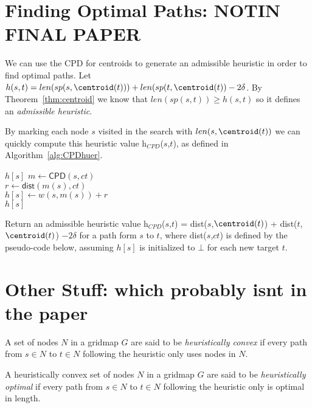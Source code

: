 \section{Finding Optimal Paths: NOTIN FINAL PAPER}

We can use the CPD for centroids 
to generate an admissible heuristic in order to find optimal paths.
Let $h(s,t) = len(sp(s,\centroid(t))) + 
                                len(sp(t,\centroid(t)) - 2 \delta$.
By Theorem~\ref{thm:centroid} we know that $len(sp(s,t)) \geq h(s,t)$ so
it defines an \emph{admissible heuristic}.

By marking each node $s$ visited in the search with $len(s,\centroid(t))$
we can quickly compute this heuristic value \textsf{h$_{CPD}$}($s$,$t$),
as defined in Algorithm~\ref{alg:CPDhuer}.

\begin{algorithm}
   {
     {\Return $h[s]$}
    $m \gets \textsf{CPD}(s,ct)$ \\
    $r \gets \textsf{dist}(m(s),ct)$ \\
    $h[s] \gets w(s,m(s)) + r$ \\
    \Return $h[s]$
   }    
\caption{Return an admissible heuristic value 
\textsf{h$_{CPD}$}($s$,$t$) = \textsf{dist}($s$,$\centroid(t)$) + \textsf{dist}($t$,$\centroid(t)$) $- 2\delta$
for a path form $s$ to $t$, where \textsf{dist}($s$,$ct$) is defined by the pseudo-code below, assuming $h[s]$ is initialized to $\bot$ for each new target $t$.}
\label{alg:CPDhuer}
\end{algorithm}




\section{Other Stuff: which probably isnt in the paper}

A set of nodes $N$ in a gridmap $G$ are said to be \emph{heuristically convex}
if every path from $s \in N$ to $t \in N$ following the heuristic only 
uses nodes in $N$. 

A heuristically convex 
set of nodes $N$ in a gridmap $G$ are said to be \emph{heuristically optimal}
if every path from $s \in N$ to $t \in N$ following the heuristic only 
is optimal in length.

